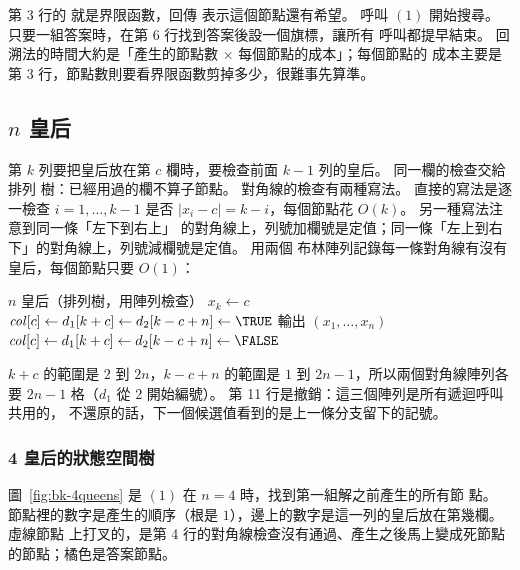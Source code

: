 第 3 行的  就是界限函數，回傳 \TRUE{} 表示這個節點還有希望。 呼叫
$(1)$ 開始搜尋。 只要一組答案時，在第 6 行找到答案後設一個旗標，讓所有
呼叫都提早結束。 回溯法的時間大約是「產生的節點數 $\times$ 每個節點的成本」；每個節點的
成本主要是第 3 行，節點數則要看界限函數剪掉多少，很難事先算準。

\subsection{\texorpdfstring{$n$}{n} 皇后}
\label{sec:bk-queens}

第 $k$ 列要把皇后放在第 $c$ 欄時，要檢查前面 $k - 1$ 列的皇后。 同一欄的檢查交給排列
樹：已經用過的欄不算子節點。 對角線的檢查有兩種寫法。 直接的寫法是逐一檢查 $i = 1, \ldots,
k - 1$ 是否 $|x_i - c| = k - i$，每個節點花 $O(k)$。 另一種寫法注意到同一條「左下到右上」
的對角線上，列號加欄號是定值；同一條「左上到右下」的對角線上，列號減欄號是定值。 用兩個
布林陣列記錄每一條對角線有沒有皇后，每個節點只要 $O(1)$：

\begin{pseudo}[label=alg:bk-queens]{$n$ 皇后（排列樹，用陣列檢查）}
         
                \State $x_k \gets c$
                \State $\mathit{col}[c] \gets d_1[k + c] \gets d_2[k - c + n] \gets \TRUE$
                    \State 輸出 $(x_1, \ldots, x_n)$
                \Else
                    \State {}
                \EndIf
                \State $\mathit{col}[c] \gets d_1[k + c] \gets d_2[k - c + n] \gets \FALSE$
            \EndIf
        \EndIf
    \EndFor
\EndProcedure
\end{pseudo}

$k + c$ 的範圍是 $2$ 到 $2n$，$k - c + n$ 的範圍是 $1$ 到 $2n - 1$，所以兩個對角線陣列各
要 $2n - 1$ 格（$d_1$ 從 $2$ 開始編號）。 第 11 行是撤銷：這三個陣列是所有遞迴呼叫共用的，
不還原的話，下一個候選值看到的是上一條分支留下的記號。

\subsubsection{4 皇后的狀態空間樹}

圖~\ref{fig:bk-4queens} 是 $(1)$ 在 $n = 4$ 時，找到第一組解之前產生的所有節
點。 節點裡的數字是產生的順序（根是 $1$），邊上的數字是這一列的皇后放在第幾欄。 虛線節點
上打叉的，是第 4 行的對角線檢查沒有通過、產生之後馬上變成死節點的節點；橘色是答案節點。

